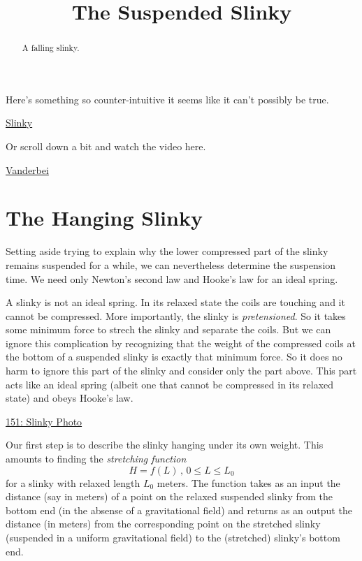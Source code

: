 \documentclass{ximera}
\title{The Suspended Slinky}
\begin{document}
\begin{abstract}
A falling slinky.
\end{abstract}
\maketitle

Here's something so counter-intuitive it seems like it can't possibly be true.

\begin{center}  
\end{center}


\href{https://www.youtube.com/watch?v=k5s1cMNTmGs}{Slinky}



Or scroll down a bit and watch the video here.

\href{dsffdhttps://vanderbei.princeton.edu/WebGL/Slinky.html}{Vanderbei}

\section{The Hanging Slinky}

Setting aside trying to explain why the lower compressed part of the slinky remains suspended for a while, we can nevertheless determine the suspension time. We need only Newton's second law and Hooke's law for an ideal spring.

A slinky is not an ideal spring. In its relaxed state the coils are touching and it cannot be compressed. More importantly, the slinky is \emph{pretensioned}. So it takes some minimum force to strech the slinky and separate the coils. But we can ignore this complication by recognizing that the weight of the compressed coils at the bottom of a suspended slinky is exactly that minimum force. So it does no harm to ignore this part of the slinky and consider only the part above. This part acts like an ideal spring (albeit one that cannot be compressed in its relaxed state) and obeys Hooke's law.

\begin{onlineOnly}
    \begin{center}
\end{center}
\end{onlineOnly}

\href{https://www.desmos.com/calculator/zqjjgael5j}{151: Slinky Photo}



Our first step is to describe the slinky hanging under its own weight. This amounts to finding the \emph{stretching function}
\[
   H = f(L) \, , \, 0\leq L \leq L_0 
\]
for a slinky with relaxed length $L_0$ meters. The function takes as an input the distance (say in meters) of a point on the relaxed suspended slinky from the bottom end (in the absense of a gravitational field) and returns as an output the distance (in meters) from the corresponding point on the stretched slinky (suspended in a uniform gravitational field) to the (stretched) slinky's bottom end. 
\end{document}
